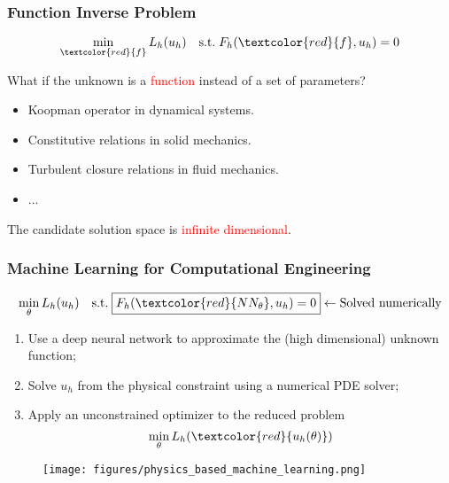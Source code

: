\documentclass[usenames,dvipsnames]{beamer}
\begin{document}
\begin{frame}
	\frametitle{Function Inverse Problem}
	
	\begin{equation*}
		\min_{\textcolor{red}{f}} L_h(u_h) \quad \mathrm{s.t.}\; F_h(\textcolor{red}{f}, u_h) = 0
	\end{equation*}
	
	What if the unknown is a \textcolor{red}{function} instead of a set of parameters?
\begin{itemize}
	\item Koopman operator in dynamical systems.
	\item Constitutive relations in solid mechanics. 
	\item Turbulent closure relations in fluid mechanics.
	\item ...
\end{itemize}

The candidate solution space is \textcolor{red}{infinite dimensional}.

\end{frame}


\begin{frame}
	\frametitle{Machine Learning for Computational Engineering}
	$$\min_{\theta} L_h(u_h) \quad \mathrm{s.t.}\;\boxed{F_h(\textcolor{red}{NN_\theta}, u_h) = 0} \leftarrow \mbox{Solved numerically}$$
	\vspace{-0.5cm}
	\begin{enumerate}
		\item Use a deep neural network to approximate the (high dimensional) unknown function;
		\item Solve $u_h$ from the physical constraint using a numerical PDE solver;
		\item Apply an unconstrained optimizer to the reduced problem
		$$\min_{\theta} L_h(\textcolor{red}{u_h(\theta)})$$
	\end{enumerate}
\vspace{-0.3cm}
	\begin{figure}[hbt]
  \texttt{[image: figures/physics\_based\_machine\_learning.png]}
\end{figure}
\end{frame}
\end{document}
